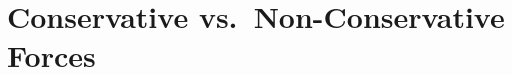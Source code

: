 \documentclass[12pt,compress,aspectratio=169]{beamer}
\begin{document}
%
%
%
%
%



\section{Conservative vs.\ Non-Conservative Forces}
\end{document}
